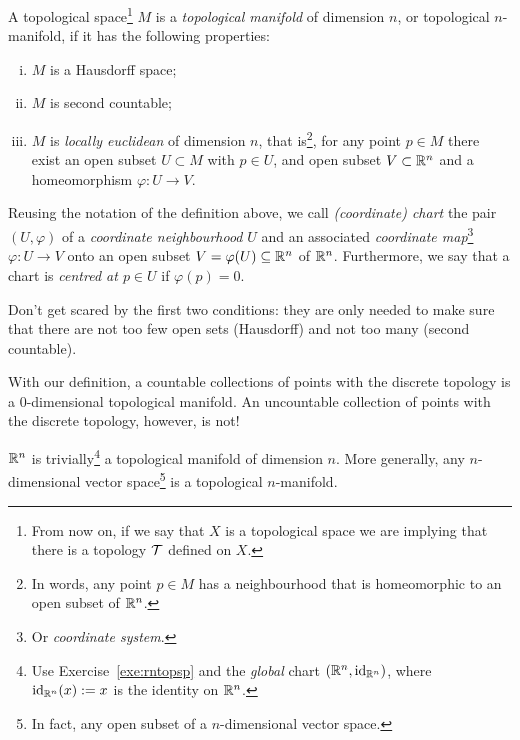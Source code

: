 \begin{definition}
  A topological space\footnote{From now on, if we say that $X$ is a topological space we are implying that there is a topology $\mathcal{T}$ defined on $X$.} $M$ is a \emph{topological manifold} of dimension $n$, or topological $n$-manifold, if it has the following properties:
  \begin{enumerate}[(i)]
    \item $M$ is a Hausdorff space;
    \item $M$ is second countable;
    \item $M$ is \emph{locally euclidean} of dimension $n$, that is\footnote{In words, any point $p\in M$ has a neighbourhood that is homeomorphic to an open subset of $\mathbb{R}^n$.}, for any point $p\in M$ there exist an open subset $U\subset M$ with $p\in U$, and open subset $V\subset\mathbb{R}^n$ and a homeomorphism $\varphi: U\to V$.
  \end{enumerate}
\end{definition}

\begin{notation}
  Reusing the notation of the definition above, we call \emph{(coordinate) chart} the pair $(U, \varphi)$ of a \emph{coordinate neighbourhood} $U$ and an associated \emph{coordinate map}\footnote{Or \emph{coordinate system}.} $\varphi: U\to V$ onto an open subset $V=\varphi(U)\subseteq\mathbb{R}^n$ of $\mathbb{R}^n$.
  Furthermore, we say that a chart is \emph{centred at $p\in U$} if $\varphi(p) = 0$.
\end{notation}

Don't get scared by the first two conditions: they are only needed to make sure that there are not too few open sets (Hausdorff) and not too many (second countable).

\begin{example}
  With our definition, a countable collections of points with the discrete topology is a $0$-dimensional topological manifold.
  An uncountable collection of points with the discrete topology, however, is not!
\end{example}

\begin{example}
  $\mathbb{R}^n$ is trivially\footnote{Use Exercise~\ref{exe:rntopsp} and the \emph{global} chart $(\mathbb{R}^n, \operatorname{id}_{\mathbb{R}^n})$, where $\operatorname{id}_{\mathbb{R}^n}(x) := x$ is the identity on $\mathbb{R}^n$.} a topological manifold of dimension $n$.
  More generally, any $n$-dimensional vector space\footnote{In fact, any open subset of a $n$-dimensional vector space.} is a topological $n$-manifold.
\end{example}

